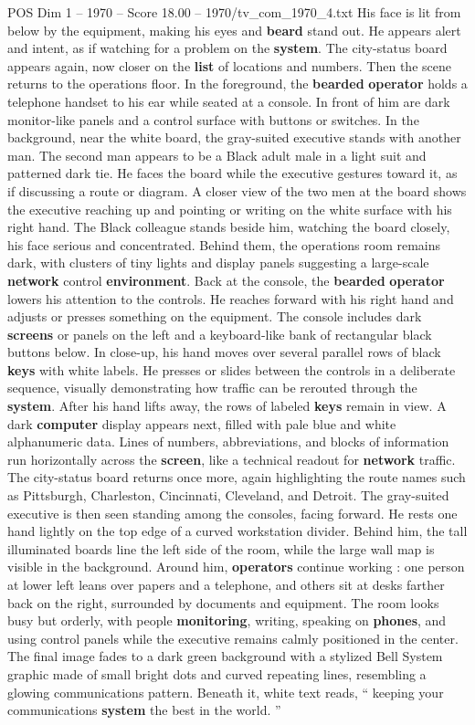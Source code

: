 \begin{textsample}{POS Dim 1 – 1970 – Score 18.00 – 1970/tv\_com\_1970\_4.txt}
His face is lit from below by the equipment, making his eyes and \textbf{beard} stand out.
He appears alert and intent, as if watching for a problem on the \textbf{system}.
The city-status board appears again, now closer on the \textbf{list} of locations and numbers.
Then the scene returns to the operations floor.
In the foreground, the \textbf{bearded} \textbf{operator} holds a telephone handset to his ear while seated at a console.
In front of him are dark monitor-like panels and a control surface with buttons or switches.
In the background, near the white board, the gray-suited executive stands with another man.
The second man appears to be a Black adult male in a light suit and patterned dark tie.
He faces the board while the executive gestures toward it, as if discussing a route or diagram.
A closer view of the two men at the board shows the executive reaching up and pointing or writing on the white surface with his right hand.
The Black colleague stands beside him, watching the board closely, his face serious and concentrated.
Behind them, the operations room remains dark, with clusters of tiny lights and display panels suggesting a large-scale \textbf{network} control \textbf{environment}.
Back at the console, the \textbf{bearded} \textbf{operator} lowers his attention to the controls.
He reaches forward with his right hand and adjusts or presses something on the equipment.
The console includes dark \textbf{screens} or panels on the left and a keyboard-like bank of rectangular black buttons below.
In close-up, his hand moves over several parallel rows of black \textbf{keys} with white labels.
He presses or slides between the controls in a deliberate sequence, visually demonstrating how traffic can be rerouted through the \textbf{system}.
After his hand lifts away, the rows of labeled \textbf{keys} remain in view.
A dark \textbf{computer} display appears next, filled with pale blue and white alphanumeric data.
Lines of numbers, abbreviations, and blocks of information run horizontally across the \textbf{screen}, like a technical readout for \textbf{network} traffic.
The city-status board returns once more, again highlighting the route names such as Pittsburgh, Charleston, Cincinnati, Cleveland, and Detroit.
The gray-suited executive is then seen standing among the consoles, facing forward.
He rests one hand lightly on the top edge of a curved workstation divider.
Behind him, the tall illuminated boards line the left side of the room, while the large wall map is visible in the background.
Around him, \textbf{operators} continue working : one person at lower left leans over papers and a telephone, and others sit at desks farther back on the right, surrounded by documents and equipment.
The room looks busy but orderly, with people \textbf{monitoring}, writing, speaking on \textbf{phones}, and using control panels while the executive remains calmly positioned in the center.
The final image fades to a dark green background with a stylized Bell System graphic made of small bright dots and curved repeating lines, resembling a glowing communications pattern.
Beneath it, white text reads, “ keeping your communications \textbf{system} the best in the world. ”


\end{textsample}
